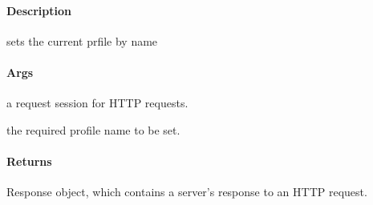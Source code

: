 \documentclass[letterpaper,10pt,english]{sphinxmanual}
\begin{document}
\begin{fulllineitems}
\label{\detokenize{gemini_perception_API:gemini_perception_API.set_perception_current_profile}}
\pysigstartsignatures
{}
\pysigstopsignatures

\paragraph{Description}
\label{\detokenize{gemini_perception_API:id38}}
\sphinxAtStartPar
sets the current prfile by name


\paragraph{Args}
\label{\detokenize{gemini_perception_API:id39}}\begin{description}
\sphinxAtStartPar
a request session for HTTP requests.

\sphinxAtStartPar
the required profile name to be set.

\end{description}


\paragraph{Returns}
\label{\detokenize{gemini_perception_API:id40}}\begin{description}
\sphinxAtStartPar
Response object, which contains a server’s response to an HTTP request.

\end{description}

\end{fulllineitems}

\end{document}
